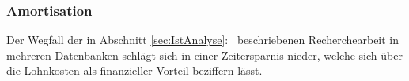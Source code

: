 

\subsubsection{Amortisation}
\label{sec:Amortisations}
Der Wegfall der in Abschnitt \ref{sec:IstAnalyse}:~ beschriebenen Recherchearbeit in mehreren 
Datenbanken schlägt sich in einer Zeitersparnis nieder, welche sich \ua über die Lohnkosten als finanzieller Vorteil beziffern lässt.\\


